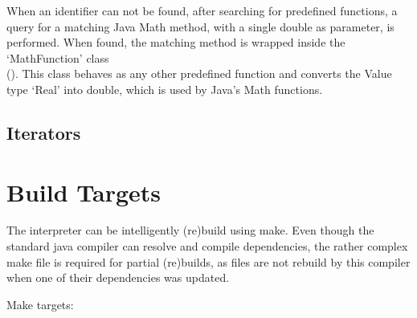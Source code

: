 When an identifier can not be found, after searching for predefined functions, a query for a matching Java Math method, with a single double as parameter, is performed. When found, the matching method is wrapped inside the `MathFunction' class\\ (). This class behaves as any other predefined function and converts the \setlX{} Value type `Real' into double, which is used by Java's Math functions.
\subsection{Iterators}


\section{Build Targets}

The interpreter can be intelligently (re)build using make. Even though the standard java compiler can resolve and compile dependencies, the rather complex make file is required for partial (re)builds, as files are not rebuild by this compiler when one of their dependencies was updated.

Make targets:

